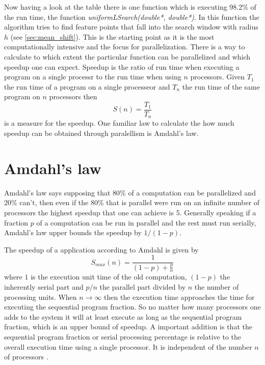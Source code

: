 Now having a look at the table there is one function which is
executing 98.2\% of the run time, the function
\emph{uniformLSearch(double*, double*)}. In this function the
algorithm tries to find feature points that fall into the search
window with radius $h$ (see \autoref{sec:mean_shift}). This is the
starting point as it is the most computationally intensive and the
focus for parallelization. There is a way to calculate to which extent
the particular function can be parallelized and which speedup one can
expect. Speedup is the ratio of run time when executing a program on a
single processr to the run time when using $n$ processors. Given $T_1$
the run time of a program on a single processeor and $T_n$ the run
time of the same program on $n$ processors then
\begin{equation}\label{eq:speedup}
  S(n) = \frac{T_1}{T_n}
\end{equation}
is a measure for the speedup. One familiar law to calculate the how
much speedup can be obtained through paralellism is Amdahl's law.

\section{Amdahl's law}
\label{sec:amdahl_s_law}
Amdahl's law says supposing that 80\% of a computation can be
parallelized and 20\% can't, then even if the 80\% that is parallel
were run on an infinite number of processors the highest speedup that
one can achieve is 5. Generally speaking if a fraction $p$ of a
computation can be run in parallel and the rest must run serially,
Amdahl's law upper bounds the speedup by $1/(1-p)$.

The speedup of a application according to Amdahl is given by
\begin{equation}\label{eq:amdahl}
  S_{max}(n) = \frac{1}{(1-p) + \frac{p}{n}}
\end{equation} 
where $1$ is the execution unit time of the old computation, $(1-p)$
the inherently serial part and $p/n$ the parallel part divided by $n$
the number of processing units. When $n \rightarrow \infty$ then the
execution time approaches the time for executing the sequential
program fraction. So no matter how many processors one adds to the
system it will at least execute as long as the sequential program
fraction, which is an upper bound of speedup. A important addition is
that the sequential program fraction or serial processing percentage
is relative to the overall execution time using a single processor. It
is independent of the number $n$ of processors
\citeauthor{citeulike:3838998} \citep{citeulike:3838998}.


